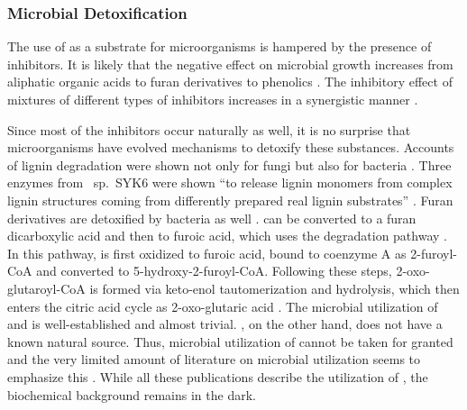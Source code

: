 \subsubsection{Microbial Detoxification}
The use of \lch{} as a substrate for microorganisms is hampered by the presence of inhibitors. It is likely that the negative effect on microbial growth increases from aliphatic organic acids to furan derivatives to phenolics \cite{Larsson1999, Palmqvist2000a}. The inhibitory effect of mixtures of different types of inhibitors increases in a synergistic manner \cite{Palmqvist1999}.

Since most of the inhibitors occur naturally as well, it is no surprise that microorganisms have evolved mechanisms to detoxify these substances. Accounts of lignin degradation were shown not only for fungi \cite{Jonsson1998} but also for bacteria \cite{Reiter2013, Kosa2013}. Three enzymes from ~sp.~SYK6 were shown \enquote{to release lignin monomers from complex lignin structures coming from differently prepared real lignin substrates} \cite{Reiter2013}. Furan derivatives are detoxified by bacteria as well \cite{Brune1983, Boopathy1993, Koopman2010, Lopez2004a, Wierckx2011}. \HMF{} can be converted to a furan dicarboxylic acid and then to furoic acid, which uses the \fur{} degradation pathway \cite{Koopman2010}. In this pathway, \fur{} is first oxidized to furoic acid, bound to coenzyme A as 2-furoyl-CoA and converted to 5-hydroxy-2-furoyl-CoA. Following these steps, 2-oxo-glutaroyl-CoA is formed via keto-enol tautomerization and hydrolysis, which then enters the citric acid cycle as 2-oxo-glutaric acid \cite{Koopman2010}. The microbial utilization of \fora{} \cite{Stickland1929, Quayle1972, Friedrich1979} and \acet{} \cite{Herlihy1987, Wright1966} is well-established and almost trivial. \Laev{}, on the other hand, does not have a known natural source. Thus, microbial utilization of \laev{} cannot be taken for granted and the very limited amount of literature on microbial \laev{} utilization seems to emphasize this \cite{Sasaki1990, Jang1996, Steinbuechel1997, Keenan2004}. While all these publications describe the utilization of \laev{}, the biochemical background remains in the dark.

